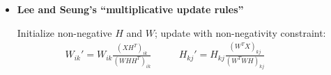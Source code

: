 \documentclass[xcolor={dvipsnames}]{beamer}
\begin{document}
{\begin{itemize}
\begin{enumerate}
\tiny
$$\arraycolsep=3pt%
\left[\begin{array}{cccc} & \text{---} &\text{---}& \\&  && \\&  &&  \end{array} \right]^T = \left( \left[\begin{array}{c}\longrightarrow \longrightarrow \\ \\ \\ \end{array} \right] \left[\begin{array}{cccc} \downarrow & \downarrow & \downarrow& \downarrow \\ \downarrow&  \downarrow  & \downarrow& \downarrow  \\ \downarrow&  \downarrow  & \downarrow& \downarrow \end{array} \right] \right)^T$$
\end{enumerate}

\vspace{.5em}

\item<4->  \textbf{Lee and Seung's ``multiplicative update rules''}

\footnotesize 

Initialize non-negative $H$ and $W$; update with non-negativity constraint:
\begin{align*} 
W_{ik}' =  W_{ik} \frac{(X H^T)_{ik}}{(WHH^T)_{ik}} {}& \quad\quad H_{kj}' =  H_{kj} \frac{(W^T X)_{kj}}{(W^TWH)_{kj}}  \quad\quad  \quad\quad 
\end{align*} 

\end{itemize}

}
\end{document}
